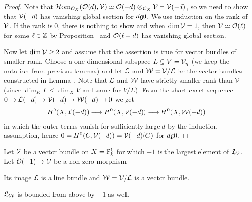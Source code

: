 \documentclass[a4paper,parskip=half,numbers=enddot, DIV=12]{scrreprt}
\begin{document}
\begin{proof}
	Note that $\operatorname{\mathcal{H} om}_{\mathcal{O}_X}(\mathcal{O}(d),\mathcal{V})\simeq \mathcal{O}(-d)\otimes_{\mathcal{O}_X}\mathcal{V}=\mathcal{V}(-d)$, so we need to show that $\mathcal{V}(-d)$ has vanishing global section for $d\gge 0$. We use induction on the rank of $\mathcal{V}$. If the rank is $0$, there is nothing to show and when $\dim\mathcal{V}=1$, then $\mathcal{V}\simeq \mathcal{O}(\ell)$ for some $\ell\in\mathbb{Z}$ by Proposition~ and $\mathcal{O}(\ell-d)$ has vanishing global section. 
	
	Now let $\dim \mathcal{V}\geq 2$ and assume that the assertion is true for vector bundles of smaller rank. Choose a one-dimensional subspace $L\subseteq V=\mathcal{V}_\eta$ (we keep the notation from previous lemmas) and let $\mathcal{L}$ and $\mathcal{W}=\mathcal{V}/\mathcal{L}$ be the vector bundles constructed in Lemma~. Note that $\mathcal{L}$ and $\mathcal{W}$ have strictly smaller rank than $\mathcal{V}$ (since $\dim_KL\leq\dim_KV$ and same for $V/L$). From the short exact sequence $0\morphism \Ll(-d)\morphism\Vv(-d)\morphism\Ww(-d)\morphism 0$ we get
	\begin{align*}
		H^0(X,\Ll(-d))\morphism H^0(X,\Vv(-d))\morphism H^0(X,\Ww(-d))
	\end{align*}
	in which the outer terms vanish for sufficiently large $d$ by the induction assumption, hence $0=H^0(C,\mathcal{V}(-d))=\mathcal{V}(-d)(C)$ for $d\gge 0$.
\end{proof}
\begin{lem}
	Let $\mathcal{V}$ be a vector bundle on $X=\mathbb{P}_k^1$ for which $-1$ is the largest element of $\mathfrak{L}_{\mathcal{V}}$. Let $\Oo(-1)\morphism \Vv$ be a non-zero morphism. 
	\begin{alphanumerate}
		\item Its image $\mathcal{L}$ is a line bundle and $\mathcal{W}=\mathcal{V}/\mathcal{L}$ is a vector bundle.
		\item $\mathfrak{L}_{\mathcal{W}}$ is bounded from above by $-1$ as well.
	\end{alphanumerate}
\end{lem}
\end{document}
